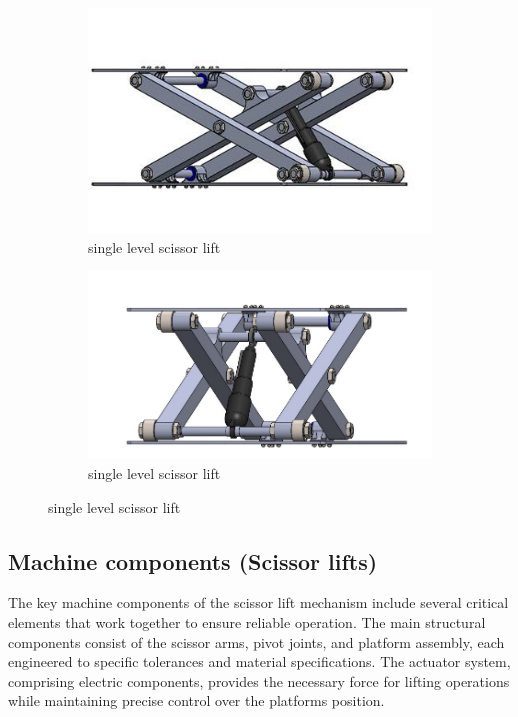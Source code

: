 \documentclass[../../main]{subfiles}
\begin{document}
\begin{figure}
\centering
\begin{subfigure}[b]{0.45\textwidth}
  \includegraphics[width=\textwidth]{img/image082.jpg}
  \caption{single level scissor lift}
\end{subfigure}
\hfil
\begin{subfigure}[b]{0.45\textwidth}
  \includegraphics[width=\textwidth]{img/image083.jpg}
  \caption{single level scissor lift}
\end{subfigure}
\end{figure}
\newpage
\subsection{Machine components (Scissor lifts)}

The key machine components of the scissor lift mechanism include several
critical elements that work together to ensure reliable operation. The
main structural components consist of the scissor arms, pivot joints,
and platform assembly, each engineered to specific tolerances and
material specifications. The actuator system, comprising electric
components, provides the necessary force for lifting operations while
maintaining precise control over the platform\textquotesingle s
position.
\end{document}
